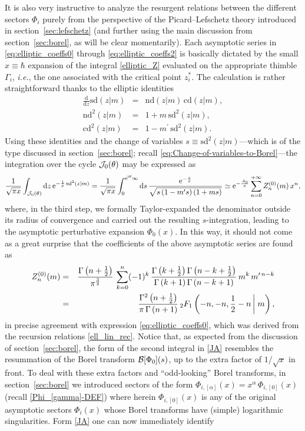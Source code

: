 \documentclass[11pt,a4paper]{article}
\newcommand{\CB}{{\cal B}}
\newcommand{\CJ}{{\cal J}}
\newcommand{\be}{\begin{equation}}
\newcommand{\ee}{\end{equation}}
\newcommand{\bea}{\begin{eqnarray}}
\newcommand{\eea}{\end{eqnarray}}
\newcommand{\rme}{{\mathrm{e}}}
\newcommand{\rmi}{{\mathrm{i}}}
\newcommand{\rmd}{{\mathrm{d}}}
\begin{document}
It is also very instructive to analyze the resurgent relations between the different sectors $\Phi_i$ purely from the perspective of the Picard--Lefschetz theory introduced in section~\ref{sec:lefschetz} (and further using the main discussion from section~\ref{sec:borel}, as will be clear momentarily). Each asymptotic series in \eqref{eq:elliptic_coeffs0} through \eqref{eq:elliptic_coeffs2} is basically dictated by the small $x\equiv\hbar$ expansion of the integral \eqref{elliptic_Z} evaluated on the appropriate thimble $\Gamma_i$, \textit{i.e.}, the one associated with the critical point $z^*_i$. The calculation is rather straightforward thanks to the elliptic identities
%
\bea
\frac{\rmd}{\rmd z} \mathrm{sd} (z | m) &=& \mathrm{nd} (z | m)\, \mathrm{cd} (z | m), \\
\mathrm{nd}^2 (z | m) &=& 1 + m\, \mathrm{sd}^2 (z | m), \\
\mathrm{cd}^2 (z | m) &=& 1 - m^\prime\, \mathrm{sd}^2 (z | m).
\eea
%
\noindent
Using these identities and the change of variables $s \equiv \mathrm{sd}^2 (z | m)$---which is of the type discussed in section~\ref{sec:borel}; recall \eqref{eq:Change-of-variables-to-Borel}---the integration over the cycle $\CJ_0 (\theta)$ may be expressed as 
%
\be
\label{JA}
\frac{1}{\sqrt{\pi x}} \int_{\CJ_0(\theta)} \rmd z\, \rme^{-\frac{1}{x}\, \mathrm{sd}^2 (z | m)} = \frac{1}{\sqrt{\pi x}} \int_0^{\rme^{\rmi\theta}\infty} \rmd s\, \frac{\rme^{-\frac{s}{x}}}{\sqrt{s \left( 1 - m^\prime s \right) \left( 1 + m s \right)}} \simeq \rme^{-\frac{A_0}{x}} \sum_{n=0}^{+\infty} Z^{(0)}_n (m)\, x^n,
\ee
%
\noindent
where, in the third step, we formally Taylor-expanded the denominator outside its radius of convergence and carried out the resulting $s$-integration, leading to the  asymptotic perturbative expansion $\Phi_0(x)$. In this way, it should not come as a great surprise that the coefficients of the above asymptotic series are found as 
%
\begin{eqnarray}
Z^{(0)}_n (m) &=& \frac{\Gamma\left(n+\frac{1}{2}\right)}{\pi^{\frac{3}{2}}}\, \sum_{k=0}^n (-1)^k\, \frac{\Gamma\left(k+\frac{1}{2}\right) \Gamma\left(n-k+\frac{1}{2}\right)}{\Gamma\left(k+1\right) \Gamma\left(n-k+1\right)}\, m^k\, m^{\prime\, n-k} \nonumber \\
&=& \frac{\Gamma^2\left(n+\frac{1}{2}\right)}{\pi\, \Gamma\left(n+1\right)}\, {}_2F_{1} \left( -n, -n, \frac{1}{2}-n\, \right| \left. \vphantom{\frac{1}{2}} m \right),
\end{eqnarray} 
%
\noindent
in precise agreement with expression \eqref{eq:elliptic_coeffs0}, which was derived from the recursion relations \eqref{ell_lin_rec}. Notice that, as expected from the discussion of section~\ref{sec:borel}, the form of the second integral in \eqref{JA} resembles the resummation of the Borel transform $\CB [\Phi_0] (s)$, up to the extra factor of $1/\sqrt{x}$ in front. To deal with these extra factors and ``odd-looking'' Borel transforms, in section~\ref{sec:borel} we introduced sectors of the form $\Phi_{i,[\alpha]}(x) = x^{\alpha}\, \Phi_{i,[0]}(x)$ (recall \eqref{Phi_[gamma]-DEF}) where herein $\Phi_{i,[0]}(x)$ is any of the original asymptotic sectors $\Phi_i (x)$ whose Borel transforms have (simple) logarithmic singularities. Form \eqref{JA} one can now immediately identify
\end{document}
